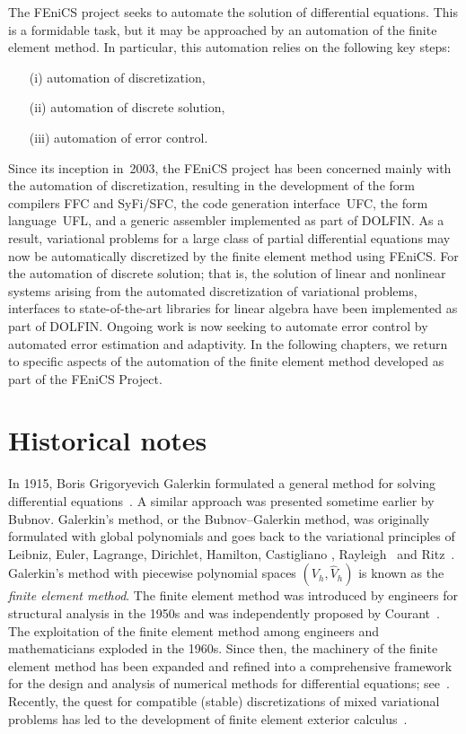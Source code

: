 The FEniCS project seeks to automate the solution of differential
equations. This is a formidable task, but it may be approached by an
automation of the finite element method. In particular, this
automation relies on the following key steps:
\begin{itemize}
\item[(i)]
  automation of discretization,
\item[(ii)]
  automation of discrete solution,
\item[(iii)]
  automation of error control.
\end{itemize}
Since its inception in~2003, the FEniCS project has been concerned
mainly with the automation of discretization, resulting in the
development of the form compilers FFC and SyFi/SFC, the code
generation interface~UFC, the form language~UFL, and a generic
assembler implemented as part of DOLFIN. As a result, variational
problems for a large class of partial differential equations may now
be automatically discretized by the finite element method using
FEniCS. For the automation of discrete solution; that is, the solution
of linear and nonlinear systems arising from the automated
discretization of variational problems, interfaces to state-of-the-art
libraries for linear algebra have been implemented as part of
DOLFIN. Ongoing work is now seeking to automate error control by
automated error estimation and adaptivity. In the following chapters,
we return to specific aspects of the automation of the finite element
method developed as part of the FEniCS Project.

\section{Historical notes}

In 1915, Boris Grigoryevich Galerkin formulated a general method for
solving differential equations~\citep{Galerkin1915}. A similar
approach was presented sometime earlier by Bubnov. Galerkin's method,
or the Bubnov--Galerkin method, was originally formulated with global
polynomials and goes back to the variational principles of Leibniz,
Euler, Lagrange, Dirichlet, Hamilton,
Castigliano \citep{Castigliano1879}, Rayleigh~\citep{Rayleigh1870} and
Ritz~\citep{Ritz1908}. Galerkin's method with piecewise polynomial
spaces $(V_h, \hat{V}_h)$ is known as the \emph{finite element
  method}. The finite element method was introduced by engineers for
structural analysis in the 1950s and was independently proposed by
Courant~\citep{Courant1943}. The exploitation of the finite element
method among engineers and mathematicians exploded in the 1960s. Since
then, the machinery of the finite element method has been expanded and
refined into a comprehensive framework for the design and analysis of
numerical methods for differential equations;
see~\citet{ZienkiewiczTaylorZhu2005firstpublishedin1967,StrangFix1973,Ciarlet1976,BeckerCareyOden1981,Hughes1987,BrennerScott2008}.
Recently, the quest for compatible (stable) discretizations of mixed
variational problems has led to the development of finite element
exterior calculus~\citep{ArnoldFalkWinther2006}.

